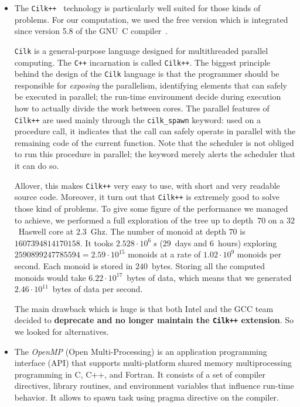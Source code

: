 \documentclass{deliverablereport}
\newcommand{\Cilk}{\texttt{Cilk}\xspace}
\newcommand{\CilkP}{\texttt{Cilk++}\xspace}
\newcommand{\CPP}{\texttt{C++}\xspace}
\begin{document}
\begin{itemize}
\item The \CilkP~\cite{CilkIntel} technology is particularly well suited for
  those kinds of problems. For our computation, we used the free version which
  is integrated since version 5.8 of the GNU~C compiler~\cite{GCCcilk}.

  \Cilk is a general-purpose language designed for multithreaded parallel
  computing. The \CPP incarnation is called \CilkP. The biggest principle
  behind the design of the \Cilk language is that the programmer should be
  responsible for \emph{exposing} the parallelism, identifying elements that
  can safely be executed in parallel; the run-time environment decide during
  execution how to actually divide the work between cores. The parallel
  features of \CilkP are used mainly through the \texttt{cilk\_spawn} keyword:
  used on a procedure call, it indicates that the call can safely operate in
  parallel with the remaining code of the current function. Note that the
  scheduler is not obliged to run this procedure in parallel; the keyword
  merely alerts the scheduler that it can do so.

  Allover, this makes \CilkP very easy to use, with short and very readable
  source code. Moreover, it turn out that \CilkP is extremely good to solve
  those kind of problems.  To give some figure of the performance we managed
  to achieve, we performed a full exploration of the tree up to depth~$70$ on
  a $32$~Haswell core at $2.3$~Ghz. The number of monoid at depth $70$ is
  $1607394814170158$.  It tooks $2.528\cdot10^{6}~s$ ($29$~days and $6$~hours)
  exploring $2590899247785594=2.59\cdot10^{15}$ monoids at a rate of
  $1.02\cdot10^{9}$ monoids per second. Each monoid is stored in
  $240$~bytes. Storing all the computed monoids would take
  $6.22\cdot10^{17}$~bytes of data, which means that we generated
  $2.46\cdot10^{11}$~bytes of data per second.

  The main drawback which is huge is that both Intel and the GCC team decided
  to \textbf{deprecate and no longer maintain the \CilkP extension}. So we
  looked for alternatives.


\item The \emph{OpenMP} (Open Multi-Processing) is an application programming
  interface (API) that supports multi-platform shared memory multiprocessing
  programming in C, C++, and Fortran. It consists of a set of compiler
  directives, library routines, and environment variables that influence
  run-time behavior. It allows to spawn task using pragma directive on the
  compiler.


\end{itemize}
\end{document}
